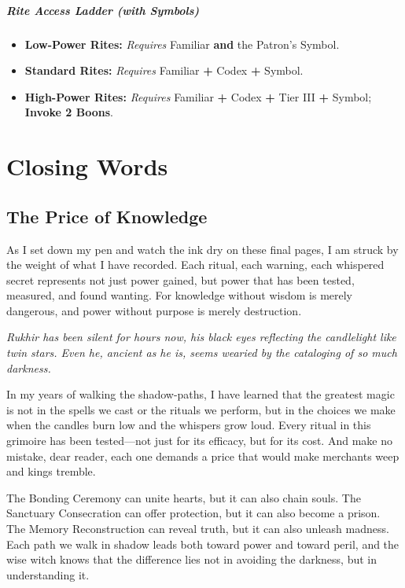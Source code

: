 \documentclass[12pt,twoside]{book}
\newcommand{\shadow}[1]{\textit{#1}}
\begin{document}
\paragraph{Rite Access Ladder (with Symbols)}
\begin{itemize}
  \item \textbf{Low-Power Rites:} \emph{Requires} Familiar \textbf{and} the Patron’s Symbol.
  \item \textbf{Standard Rites:} \emph{Requires} Familiar \textbf{+} Codex \textbf{+} Symbol.
  \item \textbf{High-Power Rites:} \emph{Requires} Familiar \textbf{+} Codex \textbf{+} Tier III \textbf{+} Symbol; \textbf{Invoke 2 Boons}.
\end{itemize}

\chapter{Closing Words}

\section*{The Price of Knowledge}

\lettrine[lines=3]{A}{}s I set down my pen and watch the ink dry on these final pages, I am struck by the weight of what I have recorded. Each ritual, each warning, each whispered secret represents not just power gained, but power that has been tested, measured, and found wanting. For knowledge without wisdom is merely dangerous, and power without purpose is merely destruction.

\shadow{Rukhir has been silent for hours now, his black eyes reflecting the candlelight like twin stars. Even he, ancient as he is, seems wearied by the cataloging of so much darkness.}

In my years of walking the shadow-paths, I have learned that the greatest magic is not in the spells we cast or the rituals we perform, but in the choices we make when the candles burn low and the whispers grow loud. Every ritual in this grimoire has been tested—not just for its efficacy, but for its cost. And make no mistake, dear reader, each one demands a price that would make merchants weep and kings tremble.

The Bonding Ceremony can unite hearts, but it can also chain souls. The Sanctuary Consecration can offer protection, but it can also become a prison. The Memory Reconstruction can reveal truth, but it can also unleash madness. Each path we walk in shadow leads both toward power and toward peril, and the wise witch knows that the difference lies not in avoiding the darkness, but in understanding it.
\end{document}
